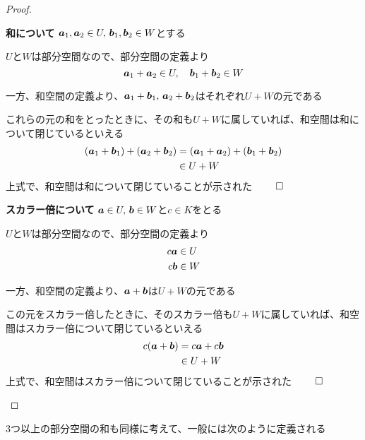 \documentclass[../../../topic_linear-algebra]{subfiles}
\begin{document}
\begin{proof}
  \begin{subpattern}{\bfseries 和について}
    $\vb*{a}_1, \vb*{a}_2 \in U, \, \vb*{b}_1, \vb*{b}_2 \in W$とする

    $U$と$W$は部分空間なので、部分空間の定義より
    \begin{equation*}
      \vb*{a}_1 + \vb*{a}_2 \in U, \quad \vb*{b}_1 + \vb*{b}_2 \in W
    \end{equation*}

    一方、和空間の定義より、$\vb*{a}_1 + \vb*{b}_1,\, \vb*{a}_2 + \vb*{b}_2$はそれぞれ$U+W$の元である

    これらの元の和をとったときに、その和も$U + W$に属していれば、和空間は和について閉じているといえる
    \begin{align*}
      (\vb*{a}_1 + \vb*{b}_1) + (\vb*{a}_2 + \vb*{b}_2) & = (\vb*{a}_1 + \vb*{a}_2) + (\vb*{b}_1 + \vb*{b}_2) \\
                                                        & \in U + W
    \end{align*}
    上式で、和空間は和について閉じていることが示された $\qed$
  \end{subpattern}

  \begin{subpattern}{\bfseries スカラー倍について}
    $\vb*{a} \in U, \, \vb*{b} \in W$と$c \in K$をとる

    $U$と$W$は部分空間なので、部分空間の定義より
    \begin{align*}
      c \vb*{a} & \in U \\
      c \vb*{b} & \in W
    \end{align*}

    一方、和空間の定義より、$\vb*{a} + \vb*{b}$は$U + W$の元である

    この元をスカラー倍したときに、そのスカラー倍も$U + W$に属していれば、和空間はスカラー倍について閉じているといえる
    \begin{align*}
      c(\vb*{a} + \vb*{b}) & = c \vb*{a} + c \vb*{b} \\
                           & \in U + W
    \end{align*}
    上式で、和空間はスカラー倍について閉じていることが示された $\qed$
  \end{subpattern}
\end{proof}

\br

3つ以上の部分空間の和も同様に考えて、一般には次のように定義される
\end{document}
